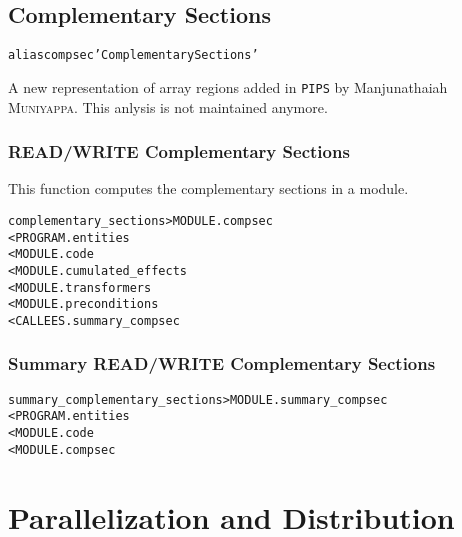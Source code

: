 \documentclass[a4paper]{report}
\newenvironment{PipsMake}{\begin{alltt}}{\end{alltt}}
\newenvironment{PipsPass}[1]{\label{pass:#1}}{}
\newcommand{\Pips}{\texttt{PIPS}}
\begin{document}
\section{Complementary Sections}
\label{subsection-complementary-sections}

\begin{PipsMake}
alias compsec 'Complementary Sections'
\end{PipsMake}

A new representation of array regions added in \Pips{} by
Manjunathaiah \textsc{Muniyappa}. This anlysis is not maintained
anymore.



\subsection{READ/WRITE Complementary Sections}
\label{subsubsection-complementary-sections}

\begin{PipsPass}{complementary_sections}
This function computes the complementary sections in a module.
\end{PipsPass}
\begin{PipsMake}
complementary_sections > MODULE.compsec
        < PROGRAM.entities
        < MODULE.code
        < MODULE.cumulated_effects
        < MODULE.transformers
        < MODULE.preconditions
        < CALLEES.summary_compsec
\end{PipsMake}

\subsection{Summary READ/WRITE Complementary Sections}
\label{subsubsection-summary-complementary-sections}


\begin{PipsMake}
summary_complementary_sections > MODULE.summary_compsec
        < PROGRAM.entities
        < MODULE.code
        < MODULE.compsec
\end{PipsMake}



\chapter{Parallelization and Distribution}
\label{section-program-transformations-parallelization-distribution}
\end{document}
